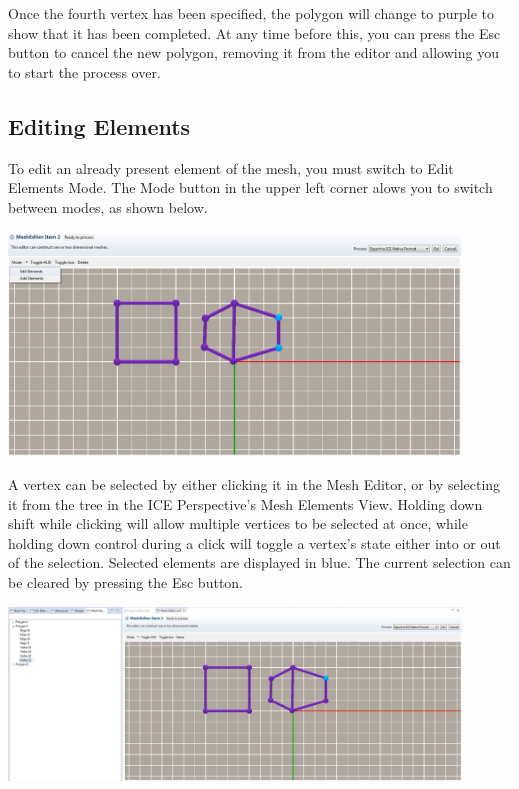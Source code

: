 \documentclass{article}
\begin{document}
Once the fourth vertex has been specified, the polygon will change to purple to
show that it has been completed. At any time before this, you can press the Esc
button to cancel the new polygon, removing it from the editor and allowing you
to start the process over. 

\subsection{Editing Elements}

To edit an already present element of the mesh, you must switch to Edit Elements
Mode. The Mode button in the upper left corner alows you to switch between
modes, as shown below.

\begin{center}
\includegraphics[width=12cm]{images/MeshEditorEditMode}
\end{center}

A vertex can be selected by either clicking it in the Mesh Editor, or by
selecting it from the tree in the ICE Perspective's Mesh Elements View. Holding
down shift while clicking will allow multiple vertices to be selected at once,
while holding down control during a click will toggle a vertex's state either
into or out of the selection. Selected elements are displayed in blue.
The current selection can be cleared by pressing the Esc button.

\begin{center}
\includegraphics[width=12cm]{images/MeshEditorSelection}
\end{center}
\end{document}
